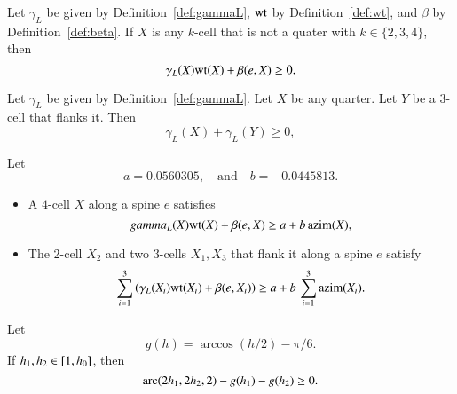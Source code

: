 \begin{calculation}\label{calc:cc:qtr}
Let $\gamma_L$ be given by Definition~\ref{def:gammaL}, ${\operatorname{wt}}$ by Definition~\ref{def:wt}, and $\beta$ by Definition~\ref{def:beta}.
If $X$ is any $k$-cell that is not a quater with $k\in\{2,3,4\}$, 
then %
\begin{displaymath}
 \gamma_L(X) {\operatorname{wt}}(X) + \beta(e,X)\ge 0.
\end{displaymath} 
\end{calculation}

\begin{calculation}\label{calc:cc:2bl}
Let $\gamma_L$ be given by Definition~\ref{def:gammaL}.
Let $X$ be any quarter.  Let $Y$ be a $3$-cell that flanks it.
Then 
\begin{displaymath}
\gamma_L(X)+\gamma_L(Y)\ge 0,
\end{displaymath}
\end{calculation}

\begin{calculation}\label{calc:cc:5bl}
Let
\begin{displaymath}
a= 0.0560305, \quad\text{and}\quad  b= -0.0445813.
\end{displaymath}
\begin{itemize}
\item {} A $4$-cell $X$ along a spine $e$ satisfies
\begin{displaymath}
gamma_L(X){\operatorname{wt}}(X) + \beta(e,X) \ge a + b\,{\operatorname{azim}}(X),
\end{displaymath}
\item {} The $2$-cell $X_2$ and two $3$-cells $X_1,X_3$ that flank it along a spine $e$ satisfy
\begin{displaymath}
\sum_{i=1}^3 \left(\gamma_L(X_i){\operatorname{wt}}(X_i) + \beta(e,X_i)\right)\ge a + b\,\sum_{i=1}^3{\operatorname{azim}}(X_i).
\end{displaymath}
\end{itemize}
\end{calculation}

\begin{calculation}\label{calc:cc:disks}\guid{}
Let
\begin{displaymath}
g(h) = \arccos(h/2) - \pi/6.
\end{displaymath}
If $h_1,h_2\in [1,{h_0}]$, then
\begin{displaymath}
{\operatorname{arc}}(2h_1,2h_2,2) - g(h_1) - g(h_2)\ge 0.
\end{displaymath}
\end{calculation}

